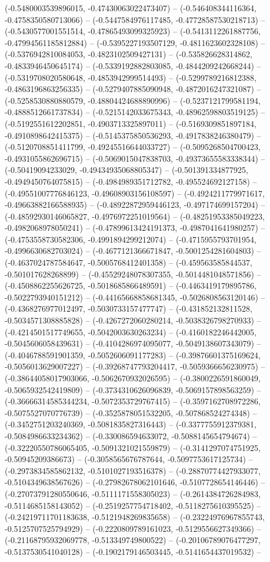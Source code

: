(-0.5480003539896015, -0.47430063022473407) -- (-0.546408344116364, -0.4758350580713066) -- (-0.5447584976117485, -0.47728587530218713) -- (-0.5430577001551514, -0.47865493099325923) -- (-0.5413112261887756, -0.47994561185812884) -- (-0.5395227193507129, -0.4811623602328108) -- (-0.5376942810084053, -0.4823102509427131) -- (-0.535826628314862, -0.4833946450645174) -- (-0.5339192882803085, -0.4844209242668244) -- (-0.5319708020580648, -0.4853942999514493) -- (-0.5299789216812388, -0.4863196863256335) -- (-0.5279407885090948, -0.4872016247321087) -- (-0.5258530880880579, -0.48804424688890996) -- (-0.5237121799581194, -0.4888512661737834) -- (-0.5215142033675343, -0.48962598803519125) -- (-0.5192551612202851, -0.4903713325897011) -- (-0.5169309851897184, -0.4910898642415375) -- (-0.5145375850536293, -0.4917838246380479) -- (-0.5120708851411799, -0.49245516644033727) -- (-0.5095268504700423, -0.4931055862696715) -- (-0.5069015047838703, -0.49373655583338344) -- (-0.50419094233029, -0.49434935068805347) -- (-0.501391334877925, -0.4949450764075815) -- (-0.4984989351712782, -0.495524692127158) -- (-0.49551007776846123, -0.49608903156108597) -- (-0.4924211779971617, -0.49663882166588935) -- (-0.48922872959446123, -0.497174699157204) -- (-0.48592930146065827, -0.4976972251019564) -- (-0.48251953385049223, -0.4982068978050241) -- (-0.47899613424191373, -0.4987041641980257) -- (-0.4753558730582306, -0.4991894299212074) -- (-0.4715955793701954, -0.4996630682703024) -- (-0.4677121366671847, -0.5001254281604803) -- (-0.4637024787584647, -0.5005768412401358) -- (-0.459563585844537, -0.501017628268899) -- (-0.45529248078307355, -0.5014481048571856) -- (-0.4508862255626725, -0.5018685866489591) -- (-0.4463419179895786, -0.5022793940151212) -- (-0.44165668858681345, -0.5026808563120146) -- (-0.4368276977012497, -0.5030733157477747) -- (-0.431852132811528, -0.5034571308885828) -- (-0.4267272060280214, -0.5038326798270933) -- (-0.4214501517749655, -0.5042003630263234) -- (-0.4160182246442005, -0.5045606058439631) -- (-0.4104286974095077, -0.5049138607343079) -- (-0.4046788591901359, -0.5052606091177283) -- (-0.39876601375169624, -0.5056013629007227) -- (-0.39268747793204417, -0.5059366656230975) -- (-0.38644058017903066, -0.5062670932026595) -- (-0.3800226591860049, -0.5065932542419809) -- (-0.3734310626096839, -0.5069157898563259) -- (-0.36666314585344234, -0.5072353729767415) -- (-0.3597162708972286, -0.5075527070776739) -- (-0.3525878051532205, -0.507868524274348) -- (-0.3452751203240369, -0.5081835827316443) -- (-0.3377755912379381, -0.5084986633234362) -- (-0.330086594633072, -0.5088145654794674) -- (-0.32220550786065405, -0.5091321021559879) -- (-0.3141297074751925, -0.50945209386673) -- (-0.3058565676787644, -0.5097753617125734) -- (-0.2973834585862132, -0.5101027193516378) -- (-0.28870774427933077, -0.5104349638567626) -- (-0.27982678062101646, -0.5107728654146446) -- (-0.27073791280550646, -0.5111171558305023) -- (-0.2614384726284983, -0.5114685158143052) -- (-0.2519257754718402, -0.5118275610395525) -- (-0.24219711701183638, -0.5121948269835658) -- (-0.23224976967855743, -0.5125707525794929) -- (-0.2220809789161023, -0.5129556627349366) -- (-0.21168795932069778, -0.513349749800522) -- (-0.20106789076477297, -0.5137530541040128) -- (-0.1902179146503445, -0.5141654437019532) -- 
